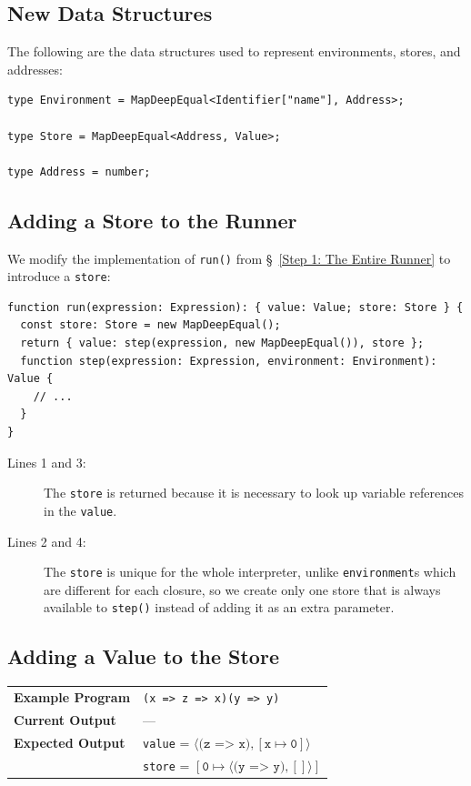 \documentclass[12pt, oneside]{book}
\begin{document}
\subsection{New Data Structures}

The following are the data structures used to represent environments, stores, and addresses:

\begin{verbatim}
type Environment = MapDeepEqual<Identifier["name"], Address>;

type Store = MapDeepEqual<Address, Value>;

type Address = number;
\end{verbatim}

\subsection{Adding a Store to the Runner}

We modify the implementation of \texttt{run()} from §~\ref{Step 1: The Entire Runner} to introduce a \texttt{store}:

\begin{verbatim}
function run(expression: Expression): { value: Value; store: Store } {
  const store: Store = new MapDeepEqual();
  return { value: step(expression, new MapDeepEqual()), store };
  function step(expression: Expression, environment: Environment): Value {
    // ...
  }
}
\end{verbatim}

\begin{description}
\item [Lines 1 and 3:] The \texttt{store} is returned because it is necessary to look up variable references in the \texttt{value}.

\item [Lines 2 and 4:] The \texttt{store} is unique for the whole interpreter, unlike \texttt{environment}s which are different for each closure, so we create only one store that is always available to \texttt{step()} instead of adding it as an extra parameter.
\end{description}

\subsection{Adding a Value to the Store}
\label{Adding a Value to the Store}

\begin{center}
\begin{tabular}{ll}
\textbf{Example Program} & \texttt{(x => z => x)(y => y)} \\
\textbf{Current Output} & — \\
\textbf{Expected Output} & \texttt{value} = $\langle \texttt{(z => x)}, [\texttt{x} \mapsto \texttt{0}] \rangle$ \\
& \texttt{store} = $[\texttt{0} \mapsto \langle \texttt{(y => y)}, [] \rangle]$ \\
\end{tabular}
\end{center}
\end{document}

